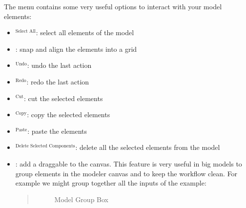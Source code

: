 \documentclass[letterpaper,10pt,english]{sphinxmanual}
\begin{document}
\sphinxAtStartPar
The  menu contains some very useful options to interact with
your model elements:
\begin{itemize}
\item {} 
\sphinxAtStartPar
{}$^{\text{Select All}}$: select all elements of the model

\item {} 
\sphinxAtStartPar
{}: snap and align the elements into a
grid

\item {} 
\sphinxAtStartPar
{}$^{\text{Undo}}$: undo the last action

\item {} 
\sphinxAtStartPar
{}$^{\text{Redo}}$: redo the last action

\item {} 
\sphinxAtStartPar
{}$^{\text{Cut}}$: cut the selected elements

\item {} 
\sphinxAtStartPar
{}$^{\text{Copy}}$: copy the selected elements

\item {} 
\sphinxAtStartPar
{}$^{\text{Paste}}$: paste the elements

\item {} 
\sphinxAtStartPar
{}$^{\text{Delete Selected Components}}$: delete all the selected
elements from the model

\item {} 
\sphinxAtStartPar
{}: add a draggable  to the canvas. This feature is very
useful in big models to group elements in the modeler canvas and to keep the
workflow clean. For example we might group together all the inputs of the
example:
\begin{quote}

\begin{figure}[H]
\centering
\capstart

\noindent{}
\caption{Model Group Box}\label{\detokenize{Introduction/models:id8}}\end{figure}
\end{quote}

\end{itemize}
\end{document}
